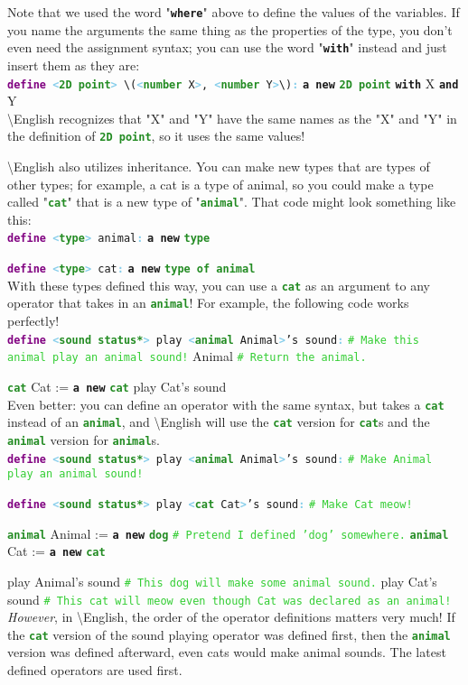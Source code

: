 \documentclass{article}
\newcommand{\English}{\textbackslash{}English}				%
\newcommand{\codecomment}[1]{\texttt{\textcolor{LimeGreen}{#1}}}
\newcommand{\commentline}[1]{\codecomment{\# #1}}
\newcommand{\type}[1]{\texttt{\textcolor{ForestGreen}{\textbf{#1}}}}
\newcommand{\keyop}[1]{\texttt{\textcolor{Purple}{\textbf{#1}}}}
\newcommand{\common}[1]{\texttt{\textcolor{Mulberry}{\textbf{#1}}}}
\newcommand{\defpunct}[1]{\texttt{\textcolor{SkyBlue}{\textbf{#1}}}}
\newcommand{\codespecial}[1]{\texttt{\textcolor{CarnationPink}{#1}}}
\newcommand{\define}[2]{\texttt{\keyop{define} \defpunct{<}#1\defpunct{>} #2\defpunct{:}}}
\newenvironment{code}[0]
{\ttfamily{}				%
\setlength\parindent{0cm}	%
~\\}
{\setlength\parindent{1cm}
~\\}
\begin{document}
\indent Note that we used the word "\common{where}" above to define the values of the variables. If you name the arguments the same thing as the properties of the type, you don't even need the assignment syntax; you can use the word "\common{with}" instead and just insert them as they are:
\begin{code}
\define{\type{2D point}}{\codespecial{\textbackslash}(\defpunct{<}\type{number} X\defpunct{>}, \defpunct{<}\type{number} Y\defpunct{>}\codespecial{\textbackslash})}
\qquad{}\common{a new} \type{2D point} \common{with} X \common{and} Y
\end{code}
\indent \English{} recognizes that "X" and "Y" have the same names as the "X" and "Y" in the definition of \type{2D point}, so it uses the same values!

\indent \English{} also utilizes inheritance. You can make new types that are types of other types; for example, a cat is a type of animal, so you could make a type called "\type{cat}" that is a new type of "\type{animal}". That code might look something like this:
\begin{code}
\define{\type{type}}{animal}
\qquad{}\common{a new} \type{type}

\define{\type{type}}{cat}
\qquad{}\common{a new} \type{type of animal}
\end{code}
\indent With these types defined this way, you can use a \type{cat} as an argument to any operator that takes in an \type{animal}! For example, the following code works perfectly!
\begin{code}
\define{\type{sound status*}}{play \defpunct{<}\type{animal} Animal\defpunct{>}'s sound}
\qquad{}\commentline{Make this animal play an animal sound!}
\qquad{}Animal	\commentline{Return the animal.}

\type{cat} Cat := \common{a new} \type{cat}
play Cat's sound
\end{code}
\indent Even better: you can define an operator with the same syntax, but takes a \type{cat} instead of an \type{animal}, and \English{} will use the \type{cat} version for \type{cat}s and the \type{animal} version for \type{animal}s.
\begin{code}
\define{\type{sound status*}}{play \defpunct{<}\type{animal} Animal\defpunct{>}'s sound}
\qquad{}\commentline{Make Animal play an animal sound!}

\define{\type{sound status*}}{play \defpunct{<}\type{cat} Cat\defpunct{>}'s sound}
\qquad{}\commentline{Make Cat meow!}

\type{animal} Animal := \common{a new} \type{dog} \commentline{Pretend I defined 'dog' somewhere.}
\type{animal} Cat := \common{a new} \type{cat}

play Animal's sound \commentline{This dog will make some animal sound.}
play Cat's sound \commentline{This cat will meow even though Cat was declared as an animal!}
\end{code}
\indent \textit{However}, in \English{}, the order of the operator definitions matters very much! If the \type{cat} version of the sound playing operator was defined first, then the \type{animal} version was defined afterward, even cats would make animal sounds. The latest defined operators are used first.
\end{document}
